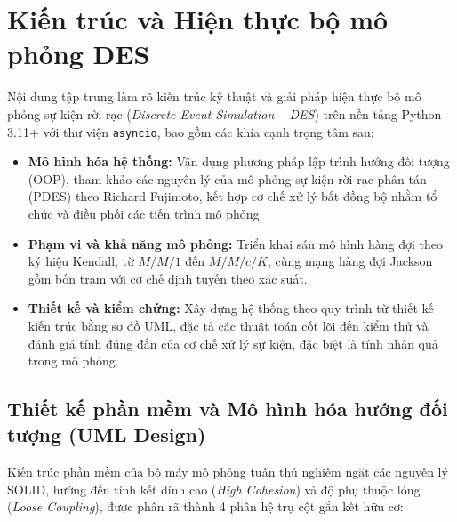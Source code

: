 \section{Kiến trúc và Hiện thực bộ mô phỏng DES}
\label{sec:kien-truc-hien-thuc}

\hspace{0.5cm}Nội dung tập trung làm rõ kiến trúc kỹ thuật và giải pháp hiện thực bộ mô phỏng sự kiện rời rạc (\textit{Discrete-Event Simulation -- DES}) trên nền tảng Python 3.11+ với thư viện \texttt{asyncio}, bao gồm các khía cạnh trọng tâm sau:

\begin{itemize}[leftmargin=1.5em, itemsep=2pt]
\item \textbf{Mô hình hóa hệ thống:} Vận dụng phương pháp lập trình hướng đối tượng (OOP), tham khảo các nguyên lý của mô phỏng sự kiện rời rạc phân tán (PDES) theo Richard Fujimoto, kết hợp cơ chế xử lý bất đồng bộ nhằm tổ chức và điều phối các tiến trình mô phỏng.

\item \textbf{Phạm vi và khả năng mô phỏng:} Triển khai sáu mô hình hàng đợi theo ký hiệu Kendall, từ $M/M/1$ đến $M/M/c/K$, cùng mạng hàng đợi Jackson gồm bốn trạm với cơ chế định tuyến theo xác suất.

\item \textbf{Thiết kế và kiểm chứng:} Xây dựng hệ thống theo quy trình từ thiết kế kiến trúc bằng sơ đồ UML, đặc tả các thuật toán cốt lõi đến kiểm thử và đánh giá tính đúng đắn của cơ chế xử lý sự kiện, đặc biệt là tính nhân quả trong mô phỏng.
\end{itemize}
\subsection{Thiết kế phần mềm và Mô hình hóa hướng đối tượng (UML Design)}
\label{subsec:uml-design}

\hspace{0.5cm}Kiến trúc phần mềm của bộ máy mô phỏng tuân thủ nghiêm ngặt các nguyên lý SOLID, hướng đến tính kết dính cao (\textit{High Cohesion}) và độ phụ thuộc lỏng (\textit{Loose Coupling}), được phân rã thành 4 phân hệ trụ cột gắn kết hữu cơ:

